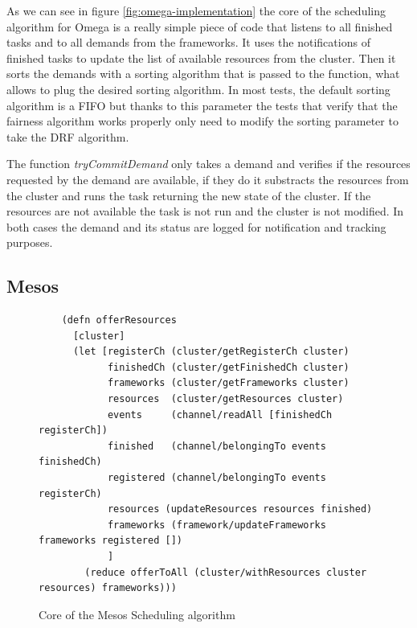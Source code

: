 \documentclass{report}                     %
\begin{document}
As we can see in figure \ref{fig:omega-implementation} the core of the
scheduling algorithm for Omega is a really simple piece of code that
listens to all finished tasks and to all demands from the
frameworks. It uses the notifications of finished tasks to update the 
list of available resources from the cluster. Then it sorts the
demands with a sorting algorithm that is passed to the function, what
allows to plug the desired sorting algorithm. In most tests, the
default sorting algorithm is a FIFO but thanks to this parameter the
tests that verify that the fairness algorithm works properly only need
to modify the sorting parameter to take the DRF algorithm.

The function \emph{tryCommitDemand} only takes a demand and verifies
if the resources requested by the demand are available, if they do it
substracts the resources from the cluster and runs the task returning
the new state of the cluster. If the resources are not available the
task is not run and the cluster is not modified. In both cases the
demand and its status are logged for notification and tracking
purposes. 


\subsection{Mesos}

\begin{figure}[!ht]
\centering
\begin{verbatim}
    (defn offerResources
      [cluster]
      (let [registerCh (cluster/getRegisterCh cluster) 
            finishedCh (cluster/getFinishedCh cluster) 
            frameworks (cluster/getFrameworks cluster)
            resources  (cluster/getResources cluster)
            events     (channel/readAll [finishedCh registerCh])
            finished   (channel/belongingTo events finishedCh)
            registered (channel/belongingTo events registerCh)
            resources (updateResources resources finished)
            frameworks (framework/updateFrameworks frameworks registered [])
            ]
        (reduce offerToAll (cluster/withResources cluster resources) frameworks)))

\end{verbatim}
\caption{Core of the Mesos Scheduling algorithm}
\label{fig:mesos-implementation}
\end{figure}
\end{document}
